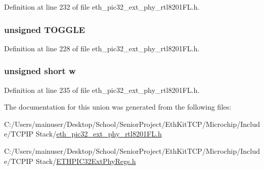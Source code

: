 Definition at line 232 of file eth\+\_\+pic32\+\_\+ext\+\_\+phy\+\_\+rtl8201\+F\+L.\+h.

\hypertarget{union_____a_n_l_p_a_d_n_pbits__t_ab4110904eded0b4b6a2280a6b4b9f4c2}{}
\subsubsection[{T\+O\+G\+G\+L\+E}]{\setlength{\rightskip}{0pt plus 5cm}unsigned T\+O\+G\+G\+L\+E}\label{union_____a_n_l_p_a_d_n_pbits__t_ab4110904eded0b4b6a2280a6b4b9f4c2}


Definition at line 228 of file eth\+\_\+pic32\+\_\+ext\+\_\+phy\+\_\+rtl8201\+F\+L.\+h.

\hypertarget{union_____a_n_l_p_a_d_n_pbits__t_a160850a4684a3e82c2323033964f2e98}{}
\subsubsection[{w}]{\setlength{\rightskip}{0pt plus 5cm}unsigned short w}\label{union_____a_n_l_p_a_d_n_pbits__t_a160850a4684a3e82c2323033964f2e98}


Definition at line 235 of file eth\+\_\+pic32\+\_\+ext\+\_\+phy\+\_\+rtl8201\+F\+L.\+h.



The documentation for this union was generated from the following files\+:\begin{DoxyCompactItemize}
\item 
C\+:/\+Users/mainuser/\+Desktop/\+School/\+Senior\+Project/\+Eth\+Kit\+T\+C\+P/\+Microchip/\+Include/\+T\+C\+P\+I\+P Stack/\hyperlink{eth__pic32__ext__phy__rtl8201_f_l_8h}{eth\+\_\+pic32\+\_\+ext\+\_\+phy\+\_\+rtl8201\+F\+L.\+h}\item 
C\+:/\+Users/mainuser/\+Desktop/\+School/\+Senior\+Project/\+Eth\+Kit\+T\+C\+P/\+Microchip/\+Include/\+T\+C\+P\+I\+P Stack/\hyperlink{_e_t_h_p_i_c32_ext_phy_regs_8h}{E\+T\+H\+P\+I\+C32\+Ext\+Phy\+Regs.\+h}\end{DoxyCompactItemize}
